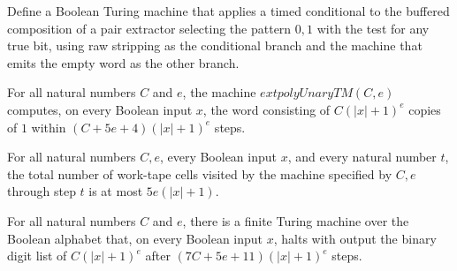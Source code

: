 \begin{definition}
\label{Turing.FinTM.stripLastTM}
\leanok
{}
Define a Boolean Turing machine that applies a timed conditional to the buffered
composition of a pair extractor selecting the pattern $0,1$ with the test for any true
bit, using raw stripping as the conditional branch and the machine that emits the empty
word as the other branch.
\end{definition}

\begin{theorem}
\label{Turing.FinTM.polyUnaryTM_computes}
\leanok
{}
For all natural numbers $C$ and $e$, the machine $	ext{polyUnaryTM}(C,e)$ computes, on
every Boolean input $x$, the word consisting of $C(|x|+1)^e$ copies of $1$ within
$(C+5e+4)(|x|+1)^e$ steps.
\end{theorem}

\begin{theorem}
\label{Turing.FinTM.polyUnaryTM_spaceUsed}
\leanok
{}
For all natural numbers $C,e$, every Boolean input $x$, and every natural number $t$,
the total number of work-tape cells visited by the machine specified by $C,e$ through
step $t$ is at most $5e(|x|+1)$.
\end{theorem}

\begin{theorem}
\label{Turing.FinTM.polyBitsTM_computes}
\leanok
{}
For all natural numbers $C$ and $e$, there is a finite Turing machine over the Boolean
alphabet that, on every Boolean input $x$, halts with output the binary digit list of
$C(|x|+1)^e$ after $(7C+5e+11)(|x|+1)^e$ steps.
\end{theorem}

